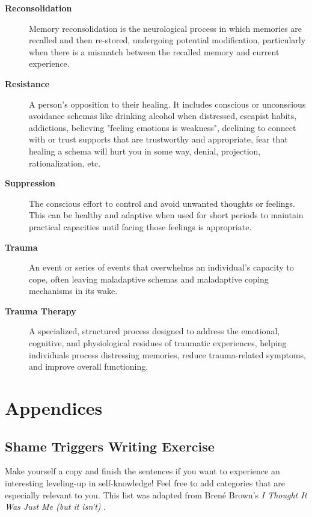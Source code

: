 \documentclass[12pt,letterpaper]{article}
\begin{document}
\begin{description}
    \item[\textbf{Reconsolidation}] Memory reconsolidation is the neurological process in which memories are recalled and then re-stored, undergoing potential modification, particularly when there is a mismatch between the recalled memory and current experience. 
    \item[\textbf{Resistance}] A person's opposition to their healing. It includes conscious or unconscious avoidance schemas like drinking alcohol when distressed, escapist habits, addictions, believing "feeling emotions is weakness", declining to connect with or trust supports that are trustworthy and appropriate, fear that healing a schema will hurt you in some way, denial, projection, rationalization, etc.
    \item[\textbf{Suppression}] The conscious effort to control and avoid unwanted thoughts or feelings. This can be healthy and adaptive when used for short periods to maintain practical capacities until facing those feelings is appropriate.
    \item[\textbf{Trauma}] An event or series of events that overwhelms an individual's capacity to cope, often leaving maladaptive schemas and maladaptive coping mechanisms in its wake.
    \item[\textbf{Trauma Therapy}] A specialized, structured process designed to address the emotional, cognitive, and physiological residues of traumatic experiences, helping individuals process distressing memories, reduce trauma-related symptoms, and improve overall functioning.
\end{description}
\appendix
\section{Appendices}
\subsection{Shame Triggers Writing Exercise}
\label{sec:shametriggers}
Make yourself a copy and finish the sentences if you want to experience an interesting leveling-up in self-knowledge! Feel free to add categories that are especially relevant to you. This list was adapted from Brené Brown's \textit{I Thought It Was Just Me (but it isn't)} \cite{brownThought}.
\end{document}
